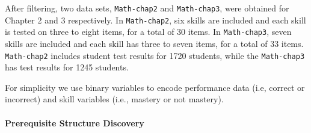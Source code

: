 \documentclass{edm_template}
\begin{document}
	After filtering, two data sets, \texttt{Math-chap2} and \texttt{Math-chap3}, were obtained for Chapter 2 and 3 respectively. 
	In \texttt{Math-chap2}, six skills are included and each skill is tested on three to eight items, for a total of 30  items.
	In \texttt{Math-chap3}, seven skills are included and each skill has three to seven items, for a total of 33 items.
	\texttt{Math-chap2} includes student test results for 1720 students, 
	while the \texttt{Math-chap3} has test results for 1245 students.
	
	For simplicity we use binary variables to encode  performance data (i.e, correct or incorrect) and skill variables  (i.e., mastery or not mastery).
	
	\paragraph{Prerequisite Structure Discovery}
	\label{sec:prerequisite_results}
	
\end{document}
